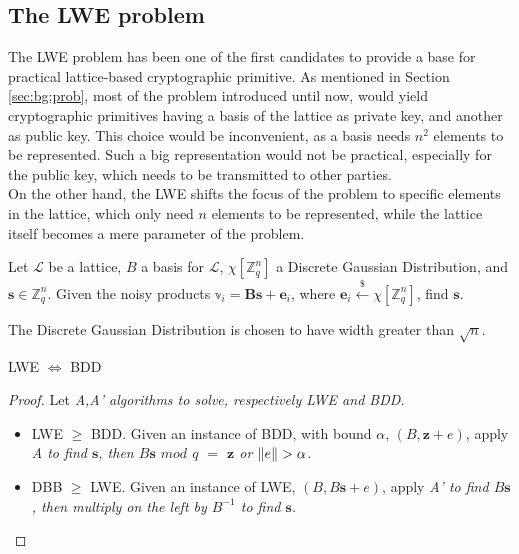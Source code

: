 \subsection{The LWE problem}
The LWE problem has been one of the first candidates to provide a base for practical lattice-based cryptographic primitive. As mentioned in Section \ref{sec:bg:prob}, most of the problem introduced until now, would yield cryptographic primitives having a basis of the lattice as private key, and another as public key. This choice would be inconvenient, as a basis needs $n^2$ elements to be represented. Such a big representation would not be practical, especially for the public key, which needs to be transmitted to other parties.\\
On the other hand, the LWE shifts the focus of the problem to specific elements in the lattice, which only need $n$ elements to be represented, while the lattice itself becomes a mere parameter of the problem.\\


\begin{definition}
Let $\mathscr{L}$ be a lattice, $B$ a basis for $\mathscr{L}$, $\chi[\mathbb{Z}_q^n]$ a Discrete Gaussian Distribution, and $\mathbf{s}\in\mathbb{Z}_q^n$. Given the noisy products $\mathbb{v}_i=\mathbf{Bs} + \mathbf{e}_i$, where $\mathbf{e}_i\xleftarrow{\$}\chi[\mathbb{Z}_q^n]$, find $\mathbf{s}$.
\end{definition}

\begin{remark}
The Discrete Gaussian Distribution is chosen to have width greater than $\sqrt{n}$.
\end{remark}

\begin{theorem}
LWE $\Leftrightarrow$ BDD
\end{theorem}
\begin{proof}
Let \it{A},\it{A'} algorithms to solve, respectively LWE and BDD.
\begin{itemize}
\item LWE $\geq$ BDD. Given an instance of BDD, with bound $\alpha$, $(B,\mathbf{z}+e)$, apply \it{A} to find $\mathbf{s}$, then $B\mathbf{s}$ $mod$ $q$ $=$ $\mathbf{z}$ or $\left\lVert e \right\rVert>\alpha$.
\item DBB $\geq$ LWE. Given an instance of LWE, $(B,B\mathbf{s}+e)$, apply \it{A'} to find $B\mathbf{s}$, then multiply on the left by $B^{-1}$ to find $\mathbf{s}$.
\end{itemize}
\end{proof}

